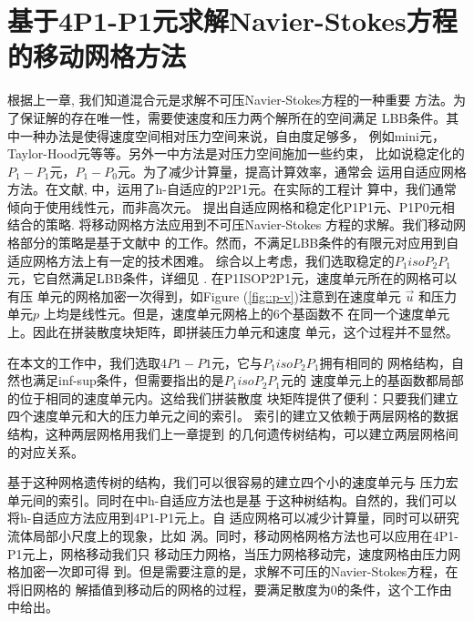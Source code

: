 

\chapter{基于4P1-P1元求解Navier-Stokes方程的移动网格方法}
\label{chapter:4P1-P1_moving}

    根据上一章, 我们知道混合元是求解不可压Navier-Stokes方程的一种重要
    方法。为了保证解的存在唯一性，需要使速度和压力两个解所在的空间满足
    LBB条件。其中一种办法是使得速度空间相对压力空间来说，自由度足够多，
    例如mini元，Taylor-Hood元等等。另外一中方法是对压力空间施加一些约束，
    比如说稳定化的$P_1-P_1$元，$P_1-P_0$元。为了减少计算量，提高计算效率，通常会
    运用自适应网格方法。在文献\cite{danaila2014newton},\cite{ebeida2009unsteady}
    \cite{berrone2009space}中，运用了h-自适应的P2P1元。在实际的工程计
    算中，我们通常倾向于使用线性元，而非高次元。
    \cite{zheng2010posteriori}提出自适应网格和稳定化P1P1元、P1P0元相
    结合的策略. \cite{di2005moving}将移动网格方法应用到不可压Navier-Stokes
    方程的求解。我们移动网格部分的策略是基于文献\cite{di2005moving}中
    的工作。然而，不满足LBB条件的有限元对应用到自适应网格方法上有一定的技术困难。
    综合以上考虑，我们选取稳定的$P_1isoP_2P_1$元，它自然满足LBB条件，详细见
    \cite{bercovier1979error}. 在P1ISOP2P1元，速度单元所在的网格可以有压
    单元的网格加密一次得到，如Figure (\ref{fig::p-v})注意到在速度单元
    $\vec{u}$ 和压力单元$p$ 上均是线性元。但是，速度单元网格上的6个基函数不
    在同一个速度单元上。因此在拼装散度块矩阵，即拼装压力单元和速度
    单元，这个过程并不显然。

    在本文的工作中，我们选取$4P1-P1$元，它与$P_1isoP_2P_1$拥有相同的
    网格结构，自然也满足inf-sup条件，但需要指出的是$P_1isoP_2P_1$元的
    速度单元上的基函数都局部的位于相同的速度单元内。这给我们拼装散度
    块矩阵提供了便利：只要我们建立四个速度单元和大的压力单元之间的索引。
    索引的建立又依赖于两层网格的数据结构，这种两层网格用我们上一章提到
    的几何遗传树结构，可以建立两层网格间的对应关系。

    基于这种网格遗传树的结构，我们可以很容易的建立四个小的速度单元与
    压力宏单元间的索引。同时在\cite{li2005multi}中h-自适应方法也是基
    于这种树结构。自然的，我们可以将h-自适应方法应用到4P1-P1元上。自
    适应网格可以减少计算量，同时可以研究流体局部小尺度上的现象，比如
    涡。同时，移动网格网格方法也可以应用在4P1-P1元上，网格移动我们只
    移动压力网格，当压力网格移动完，速度网格由压力网格加密一次即可得
    到。但是需要注意的是，求解不可压的Navier-Stokes方程，在将旧网格的
    解插值到移动后的网格的过程，要满足散度为0的条件，这个工作由
    \cite{di2005moving}中给出。


